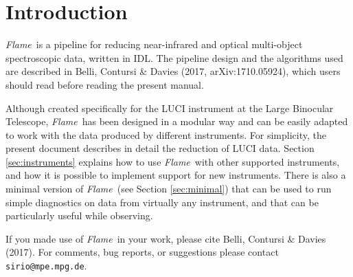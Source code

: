 \documentclass[a4paper]{article}
\newcommand{\flame}{\emph{Flame}}
\begin{document}
\begin{sloppypar}


\newpage
\section{Introduction}
\label{sec:introduction}

\flame\ is a pipeline for reducing near-infrared and optical multi-object spectroscopic data, written in IDL. The pipeline design and the algorithms used are described in Belli, Contursi \& Davies (2017, arXiv:1710.05924), which users should read before reading the present manual.

Although created specifically for the LUCI instrument at the Large Binocular Telescope, \flame\ has been designed in a modular way and can be easily adapted to work with the data produced by different instruments. For simplicity, the present document describes in detail the reduction of LUCI data. Section \ref{sec:instruments} explains how to use \flame\ with other supported instruments, and how it is possible to implement support for new instruments. There is also a minimal version of \flame\ (see Section \ref{sec:minimal}) that can be used to run simple diagnostics on data from virtually any instrument, and that can be particularly useful while observing.

If you made use of \flame\ in your work, please cite Belli, Contursi \& Davies (2017). For comments, bug reports, or suggestions please contact \texttt{sirio@mpe.mpg.de}.





\end{sloppypar}
\end{document}
